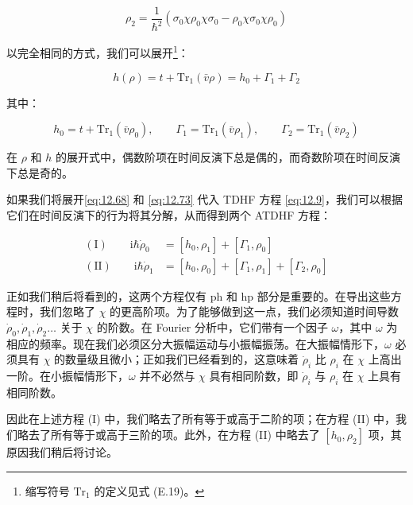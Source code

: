 \begin{equation}
\rho_{2}=\frac{1}{\hbar^{2}}\left(\sigma_{0}\chi\rho_{0}\chi\sigma_{0}-\rho_{0}\chi\sigma_{0}\chi\rho_{0}\right)\label{eq:12.72}
\end{equation}

以完全相同的方式，我们可以展开\footnote{缩写符号 $\mathrm{Tr}_{1}$ 的定义见式 (E.19)。}：

\begin{equation}
h(\rho)=t+\mathrm{Tr}_{1}(\bar{v}\rho)=h_{0}+\Gamma_{1}+\Gamma_{2}\label{eq:12.73}
\end{equation}

其中：

\begin{equation}
h_{0}=t+\mathrm{Tr}_{1}(\bar{v}\rho_{0}),\qquad\Gamma_{1}=\mathrm{Tr}_{1}(\bar{v}\rho_{1}),\qquad\Gamma_{2}=\mathrm{Tr}_{1}(\bar{v}\rho_{2})\label{eq:12.74}
\end{equation}

在 $\rho$ 和 $h$ 的展开式中，偶数阶项在时间反演下总是偶的，而奇数阶项在时间反演下总是奇的。

如果我们将展开\ref{eq:12.68} 和 \ref{eq:12.73} 代入 TDHF 方程 \ref{eq:12.9}，我们可以根据它们在时间反演下的行为将其分解，从而得到两个
ATDHF 方程：

\begin{align}
(\mathrm{I})\qquad\mathrm{i}\hbar\dot{\rho}_{0} & =[h_{0},\rho_{1}]+[\Gamma_{1},\rho_{0}]\label{eq:12.75a}\\
(\mathrm{II})\qquad\mathrm{i}\hbar\dot{\rho}_{1} & =[h_{0},\rho_{0}]+[\Gamma_{1},\rho_{1}]+[\Gamma_{2},\rho_{0}]\label{eq:12.75b}
\end{align}

正如我们稍后将看到的，这两个方程仅有 ph 和 hp 部分是重要的。在导出这些方程时，我们忽略了 $\chi$ 的更高阶项。为了能够做到这一点，我们必须知道时间导数
$\dot{\rho}_{0},\dot{\rho}_{1},\dot{\rho}_{2}\dots$ 关于 $\chi$ 的阶数。在
Fourier 分析中，它们带有一个因子 $\omega$，其中 $\omega$ 为相应的频率。现在我们必须区分大振幅运动与小振幅振荡。在大振幅情形下，$\omega$
必须具有 $\chi$ 的数量级且微小；正如我们已经看到的，这意味着 $\dot{\rho}_{i}$ 比 $\rho_{i}$
在 $\chi$ 上高出一阶。在小振幅情形下，$\omega$ 并不必然与 $\chi$ 具有相同阶数，即 $\dot{\rho}_{i}$
与 $\rho_{i}$ 在 $\chi$ 上具有相同阶数。

因此在上述方程 (I) 中，我们略去了所有等于或高于二阶的项；在方程 (II) 中，我们略去了所有等于或高于三阶的项。此外，在方程
(II) 中略去了 $[h_{0},\rho_{2}]$ 项，其原因我们稍后将讨论。

